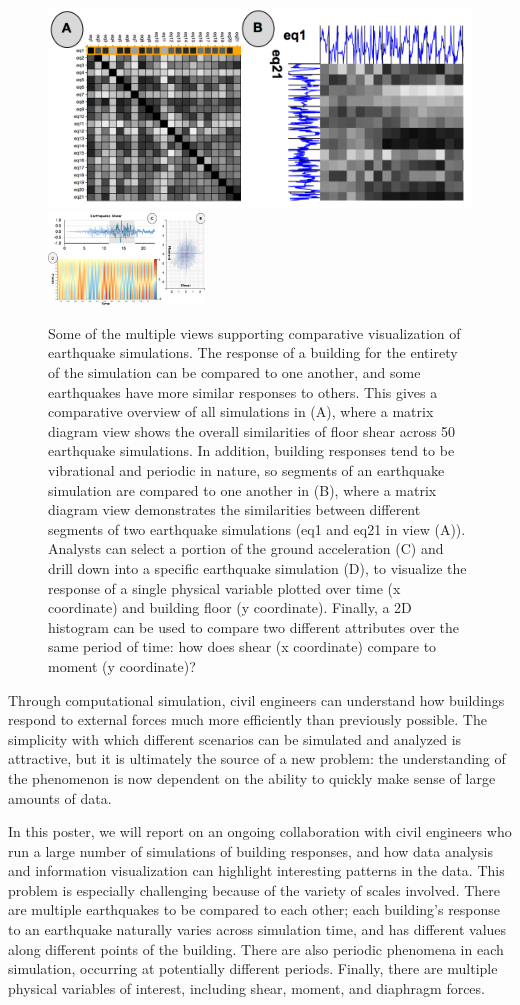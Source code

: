\begin{figure}
      \centering
      \includegraphics[width=.49\textwidth]{figs/vis1} %
      \includegraphics[width=0.37\textwidth]{figs/vis2}
        \caption{Some of the multiple views supporting comparative visualization of earthquake simulations. The response of a building for the entirety of the simulation can be compared to one another, and some earthquakes have more similar responses to others. This gives a comparative overview of all simulations in (A), where a matrix diagram view shows the overall similarities of floor shear across 50 earthquake simulations. In addition, building responses tend to be vibrational and periodic in nature, so segments of an earthquake simulation are compared to one another in (B), where a matrix diagram view demonstrates the similarities between different segments of two earthquake simulations (eq1 and eq21 in view (A)). Analysts can select a portion of the ground acceleration (C) and drill down into a specific earthquake simulation (D), to visualize the response of a single physical variable plotted over time (x coordinate) and building floor (y coordinate). Finally, a 2D histogram can be used to compare two different attributes over the same period of time: how does shear (x coordinate) compare to moment (y coordinate)?\label{fig:teaser}}
\end{figure}

Through computational simulation, civil engineers can understand how buildings respond to external forces much more efficiently than previously possible.
The simplicity with which different scenarios can be simulated and analyzed is attractive, but it is ultimately the source of a new problem: the understanding of the phenomenon is now dependent on the ability to quickly make sense of large amounts of data.

In this poster, we will report on an ongoing collaboration with civil engineers who run a large number of simulations of building responses, and how data analysis and information visualization can highlight interesting patterns in the data.
This problem is especially challenging because of the variety of scales involved. There are multiple earthquakes to be compared to each other; each building's response to an earthquake naturally varies across simulation time, and has different values along different points of the building. There are also periodic phenomena in each simulation, occurring at potentially different periods. Finally, there are multiple physical variables of interest, including shear, moment, and diaphragm forces.

